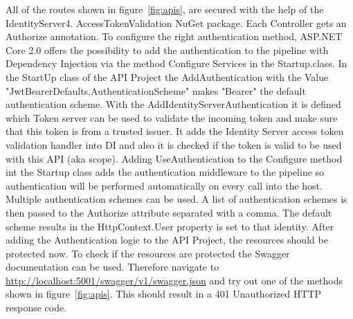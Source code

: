 All of the routes shown in figure~\ref{fig:apis}, are secured with the help of the IdentityServer4. AccessTokenValidation NuGet package. Each Controller gets an Authorize annotation. 
To configure the right authentication method, ASP.NET Core 2.0 offers the possibility to add the authentication to the pipeline with Dependency Injection via the method Configure Services in the Startup.class.
In the StartUp class of the API Project the AddAuthentication with the Value "JwtBearerDefaults.AuthenticationScheme" makes "Bearer" the default authentication scheme. With the AddIdentityServerAuthentication it is defined which Token server can be used to validate the incoming token and make sure that this token is from a trusted issuer. It adds the Identity Server access token validation handler into DI and also it is checked if the token is valid to be used with this API (aka scope). Adding UseAuthentication to the Configure method int the Startup class adds the authentication middleware to the pipeline so authentication will be performed automatically on every call into the host.  Multiple authentication schemes can be used. A list of authentication schemes is then passed to the Authorize attribute separated with a comma. The default scheme results in the HttpContext.User property is set to that identity. After adding the Authentication logic to the API Project, the resources should be protected now. To check if the resources are protected the Swagger documentation can be used. Therefore navigate to \url{http://localhost:5001/swagger/v1/swagger.json} and try out one of the methods shown in figure~\ref{fig:apis}. This should result in a 401 Unauthorized HTTP response code.


